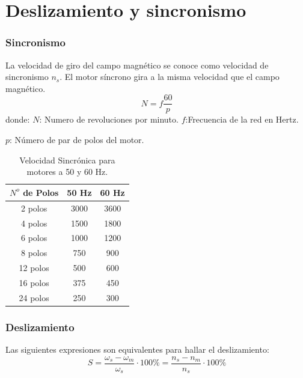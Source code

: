 \documentclass[../mainnull]{subfiles}
\begin{document}
\chapter{Deslizamiento y sincronismo}
\begin{center}
\end{center}
\subsection{Sincronismo}
La velocidad de giro del campo magnético se conoce como velocidad de
sincronismo $n_s$. El motor síncrono gira a la misma velocidad que el
campo magnético.
\begin{equation}
  N=f \frac{60}{p}
\end{equation}
donde:
$N$: Numero de revoluciones por minuto.
$f$:Frecuencia de la red en Hertz.

$p$: Número de par de polos del motor.

\begin{table}[h!]
  \centering
  \begin{tabular}{|c|c|c|}\hline
    $N^o$ de Polos &  50 Hz & 60 Hz \\ \hline \hline
    2 polos & 3000 &3600 \\
    4 polos & 1500 & 1800 \\
    6 polos & 1000 & 1200 \\
    8 polos & 750 & 900 \\
    12 polos & 500 & 600 \\
    16 polos & 375 & 450 \\
    24 polos & 250 & 300 \\ \hline
  \end{tabular}
  \caption{Velocidad Sincrónica para motores a 50 y 60 Hz.}
  \label{tab:my_tableherz}
\end{table}

\subsection{Deslizamiento}

Las siguientes expresiones son equivalentes para hallar el deslizamiento:
\begin{equation}
  S=\frac{\omega_s - \omega_m}{\omega_s} \cdot 100\%=
  \frac{n_s-n_m}{n_s}\cdot 100\%
\end{equation}
\end{document}
